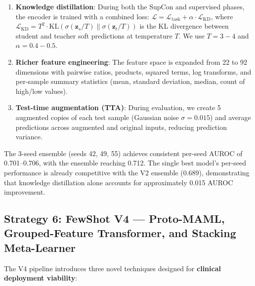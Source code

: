\begin{enumerate}
\item \textbf{Knowledge distillation}: During both the SupCon and supervised phases, the encoder is trained with a combined loss: $\mathcal{L} = \mathcal{L}_{\text{task}} + \alpha \cdot \mathcal{L}_{\text{KD}}$, where $\mathcal{L}_{\text{KD}} = T^2 \cdot \text{KL}(\sigma(\mathbf{z}_s/T) \| \sigma(\mathbf{z}_t/T))$ is the KL divergence between student and teacher soft predictions at temperature $T$. We use $T=3{-}4$ and $\alpha=0.4{-}0.5$.
\item \textbf{Richer feature engineering}: The feature space is expanded from 22 to 92 dimensions with pairwise ratios, products, squared terms, log transforms, and per-sample summary statistics (mean, standard deviation, median, count of high/low values).
\item \textbf{Test-time augmentation (TTA)}: During evaluation, we create 5 augmented copies of each test sample (Gaussian noise $\sigma=0.015$) and average predictions across augmented and original inputs, reducing prediction variance.
\end{enumerate}

The 3-seed ensemble (seeds 42, 49, 55) achieves consistent per-seed AUROC of 0.701--0.706, with the ensemble reaching 0.712. The single best model's per-seed performance is already competitive with the V2 ensemble (0.689), demonstrating that knowledge distillation alone accounts for approximately 0.015 AUROC improvement.

\subsection{Strategy 6: FewShot V4 --- Proto-MAML, Grouped-Feature Transformer, and Stacking Meta-Learner}
\label{sec:v4-strategy}

The V4 pipeline introduces three novel techniques designed for \textbf{clinical deployment viability}:

